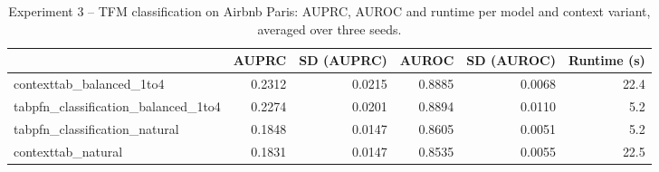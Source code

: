 \begin{table}
\centering
\caption{Experiment 3 -- TFM classification on Airbnb Paris: AUPRC, AUROC and runtime per model and context variant, averaged over three seeds.}
\label{tab:exp3_airbnb_paris}
\begin{tabular}{lrrrrr}
\toprule
 & \bfseries AUPRC & \bfseries SD (AUPRC) & \bfseries AUROC & \bfseries SD (AUROC) & \bfseries Runtime (s) \\
\midrule
contexttab\_balanced\_1to4 & 0.2312 & 0.0215 & 0.8885 & 0.0068 & 22.4 \\
tabpfn\_classification\_balanced\_1to4 & 0.2274 & 0.0201 & 0.8894 & 0.0110 & 5.2 \\
tabpfn\_classification\_natural & 0.1848 & 0.0147 & 0.8605 & 0.0051 & 5.2 \\
contexttab\_natural & 0.1831 & 0.0147 & 0.8535 & 0.0055 & 22.5 \\
\bottomrule
\end{tabular}
\end{table}
